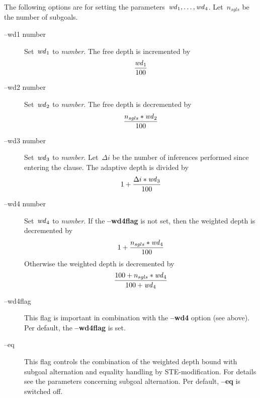 \begin{description}
           The following options are for setting the
           parameters~$\mbox{{\it wd\/}}_1, \dots, \mbox{{\it
           wd\/}}_4$. Let~$n_{sgls}$ be the number of subgoals.  
           \begin{description}
           \item [--wd1 number]
                 Set~$\mbox{{\it wd\/}}_1$ to {\it number\/}.
                 The free depth is incremented by 
                 \[  
                     \frac{\mbox{{\it wd\/}}_1}
                          {100}
                 \] 
           \item [--wd2 number]
                 Set~$\mbox{{\it wd\/}}_2$ to {\it number\/}.
                 The free depth is decremented by 
                 \[  
                     \frac{n_{sgls} * \mbox{{\it wd\/}}_2}
                          {100}  
                 \]
           \item [--wd3 number]
                 Set~$\mbox{{\it wd\/}}_3$ to {\it number\/}.
                 Let~$\Delta i$ be the number of inferences performed
                 since entering the clause. The adaptive depth is
                 divided by
                 \[  
                     1 + \frac{\Delta i * \mbox{{\it wd\/}}_3}
                              {100}
                 \]
           \item [--wd4 number]
                 Set~$\mbox{{\it wd\/}}_4$ to {\it number\/}.
                 If the {\bf --wd4flag} is not set, then the weighted
                 depth is decremented  by 
                 \[  
                     1 + \frac{n_{sgls} * 
                               \mbox{{\it wd\/}}_4}
                              {100}  
                 \]
                 Otherwise the weighted depth is decremented by
                 \[  
                     \frac{100 + n_{sgls} * 
                                 \mbox{{\it wd\/}}_4}
                          {100 + \mbox{{\it wd\/}}_4}
                 \]
           \item [--wd4flag]
                 This flag is important in combination with the
                 {\bf --wd4} option (see above). 
                 Per default, the {\bf --wd4flag} is set. 
           \item [--eq]
                 This flag controls the combination of the weighted
                 depth bound with subgoal alternation and equality
                 handling by STE-modification. 
                 For details see the parameters concerning subgoal
                 alternation. 
                 Per default, {\bf --eq} is switched off. 

\end{description}
\end{description}
